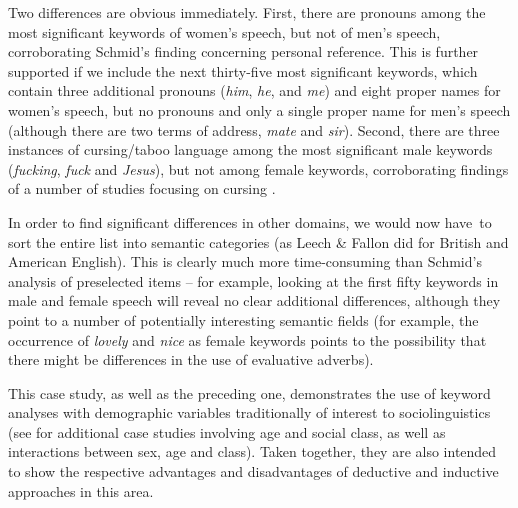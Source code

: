 Two differences are obvious immediately. First, there are pronouns  among the most significant keywords  of women's speech, but not of men's speech, corroborating Schmid's finding concerning personal reference. This is further supported if we include the next thirty\hyp{}five most significant keywords, which contain three additional pronouns  (\textit{him}, \textit{he}, and \textit{me}) and eight proper names for women's speech, but no pronouns  and only a single proper name for men's speech (although there are two terms of address, \textit{mate} and \textit{sir}).  Second, there are three instances of cursing\slash taboo language among the most significant male keywords (\textit{fucking}, \textit{fuck} and \textit{Jesus}), but not among female keywords,  corroborating findings of a number of studies focusing on cursing \citep[cf.][]{murphy_shes_2009}.

In order to find significant differences in other domains, we would now \mbox{have to} sort the entire list into semantic  categories  (as Leech \& Fallon did for British  and American  English). This is clearly much more time\hyp{}consuming than Schmid's analysis of preselected items -- for example, looking at the first fifty keywords  in male and female speech will reveal no clear additional differences,  although they point to a number of potentially interesting semantic fields (for example, the occurrence of \textit{lovely} and \textit{nice} as female keywords points to the possibility that there might be differences in the use of evaluative  adverbs).\largerpage[2]

This case study, as well as the preceding one, demonstrates the use of keyword  analyses with demographic  variables traditionally of interest to sociolinguistics  (see \citealt{rayson_social_1997} for additional case studies involving age  and social class, as well as interactions between sex, age  and class). Taken together, they are also intended to show the respective advantages and disadvantages of deductive  and inductive  approaches in this area.

